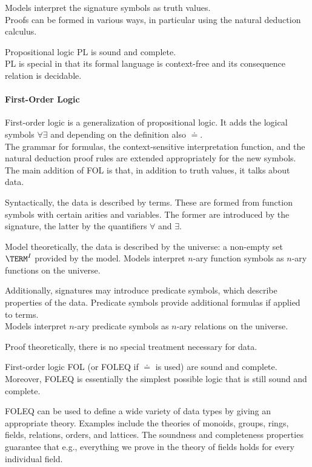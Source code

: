 Models interpret the signature symbols as truth values.\\
Proofs can be formed in various ways, in particular using the natural deduction calculus.
\medskip

Propositional logic PL is sound and complete.\\
PL is special in that its formal language is context-free and its consequence relation is decidable.

\paragraph{First-Order Logic}
First-order logic is a generalization of propositional logic. It adds the logical symbols $\forall\exists$ and depending on the definition also $\doteq$.\\
The grammar for formulas, the context-sensitive interpretation function, and the natural deduction proof rules are extended appropriately for the new symbols.\\

The main addition of FOL is that, in addition to truth values, it talks about data.

Syntactically, the data is described by terms.
These are formed from function symbols with certain arities and variables.
The former are introduced by the signature, the latter by the quantifiers $\forall$ and $\exists$.

Model theoretically, the data is described by the universe: a non-empty set $\TERM^I$ provided by the model.
Models interpret $n$-ary function symbols as $n$-ary functions on the universe.

Additionally, signatures may introduce predicate symbols, which describe properties of the data.
Predicate symbols provide additional formulas if applied to terms.\\
Models interpret $n$-ary predicate symbols as $n$-ary relations on the universe.

Proof theoretically, there is no special treatment necessary for data.
\medskip

First-order logic FOL (or FOLEQ if $\doteq$ is used) are sound and complete.
Moreover, FOLEQ is essentially the simplest possible logic that is still sound and complete.
\medskip

FOLEQ can be used to define a wide variety of data types by giving an appropriate theory.
Examples include the theories of monoids, groups, rings, fields, relations, orders, and lattices.
The soundness and completeness properties guarantee that e.g., everything we prove in the theory of fields holds for every individual field.

